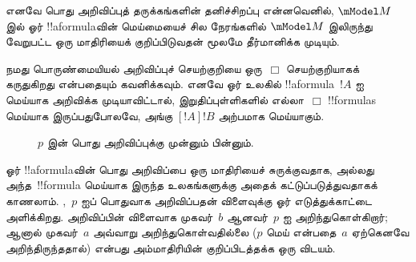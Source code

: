 \documentclass[../../../include/open-logic-section]{subfiles}
\begin{document}
எனவே பொது அறிவிப்புத் தருக்கங்களின் தனிச்சிறப்பு என்னவெனில்,
$\mModel M$ இல் ஓர் !!a{formula}வின் மெய்மையைச் சில நேரங்களில்
$\mModel M$ இலிருந்து வேறுபட்ட ஒரு மாதிரியைக் குறிப்பிடுவதன் மூலமே
தீர்மானிக்க முடியும்.

நமது பொருண்மையியல் அறிவிப்புச் செயற்குறியை ஒரு~$\Box$ செயற்குறியாகக்
கருதுகிறது என்பதையும் கவனிக்கவும். எனவே ஓர் உலகில் !!a{formula}~$!A$ ஐ
மெய்யாக அறிவிக்க முடியாவிட்டால், இறுதிப்புள்ளிகளில் எல்லா~$\Box$ !!{formula}s
மெய்யாக இருப்பதுபோலவே, அங்கு $[!A]!B$ அற்பமாக மெய்யாகும்.

\begin{figure}
  \begin{center}
  \end{center}
  \caption{$p$ இன் பொது அறிவிப்புக்கு முன்னும் பின்னும்.}
\end{figure}

ஓர் !!a{formula}வின் பொது அறிவிப்பை ஒரு மாதிரியைச் சுருக்குவதாக, அல்லது
அந்த~!!{formula} மெய்யாக இருந்த உலகங்களுக்கு அதைக் கட்டுப்படுத்துவதாகக் காணலாம்.
,~$p$ ஐப் பொதுவாக அறிவிப்பதன் விளைவுக்கு ஓர்
எடுத்துக்காட்டை அளிக்கிறது. அறிவிப்பின் விளைவாக முகவர்~$b$ ஆனவர்~$p$ ஐ
அறிந்துகொள்கிறார்; ஆனால் முகவர்~$a$ அவ்வாறு அறிந்துகொள்வதில்லை ($p$ மெய்
என்பதை~$a$ ஏற்கெனவே அறிந்திருந்ததால்) என்பது அம்மாதிரியின் குறிப்பிடத்தக்க
ஒரு விடயம்.
\end{document}
